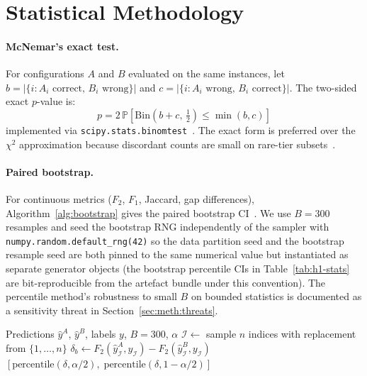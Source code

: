 \section{Statistical Methodology}\label{sec:meth:stats}

\paragraph{McNemar's exact test.}
For configurations $A$ and $B$ evaluated on the same instances, let
$b = |\{i : A_i \text{ correct},\, B_i \text{ wrong}\}|$ and
$c = |\{i : A_i \text{ wrong},\, B_i \text{ correct}\}|$.
The two-sided exact $p$-value is:
%
\begin{equation}\label{eq:mcnemar}
  p = 2\,\mathbb{P}\!\left[\mathrm{Bin}\!\left(b{+}c,\,\tfrac{1}{2}\right)
      \leq \min(b,c)\right]
\end{equation}
%
implemented via \texttt{scipy.stats.binomtest}~\cite{virtanen2020scipy}. The exact
form is preferred over the $\chi^2$ approximation because discordant counts are small
on rare-tier subsets~\cite{mcnemar1947note}.

\paragraph{Paired bootstrap.}
For continuous metrics ($F_2$, $F_1$, Jaccard, gap differences), Algorithm~\ref{alg:bootstrap}
gives the paired bootstrap CI~\cite{efron1979bootstrap,riezler2005pitfalls}.
We use $B{=}300$ resamples and seed the bootstrap RNG independently of the
sampler with \texttt{numpy.random.default\_rng(42)} so the data partition seed
and the bootstrap resample seed are both pinned to the same numerical value
but instantiated as separate generator objects (the bootstrap percentile CIs
in Table~\ref{tab:h1-stats} are bit-reproducible from the artefact bundle
under this convention). The percentile method's robustness to small $B$ on
bounded statistics is documented as a sensitivity threat in
Section~\ref{sec:meth:threats}.

\begin{algorithm}[h]
  \caption{Paired bootstrap confidence interval for $\Delta F_2$}
  \label{alg:bootstrap}
  \begin{algorithmic}[1]
    \Require Predictions $\hat{y}^A$, $\hat{y}^B$, labels $y$, $B{=}300$, $\alpha$
      \State $\mathcal{I} \gets$ sample $n$ indices with replacement from $\{1,\dots,n\}$
      \State $\delta_b \gets F_2(\hat{y}^A_{\mathcal{I}}, y_{\mathcal{I}}) -
                           F_2(\hat{y}^B_{\mathcal{I}}, y_{\mathcal{I}})$
    \EndFor
    \State \Return $\left[\mathrm{percentile}(\delta, \alpha/2),\;
                          \mathrm{percentile}(\delta, 1{-}\alpha/2)\right]$
  \end{algorithmic}
\end{algorithm}

